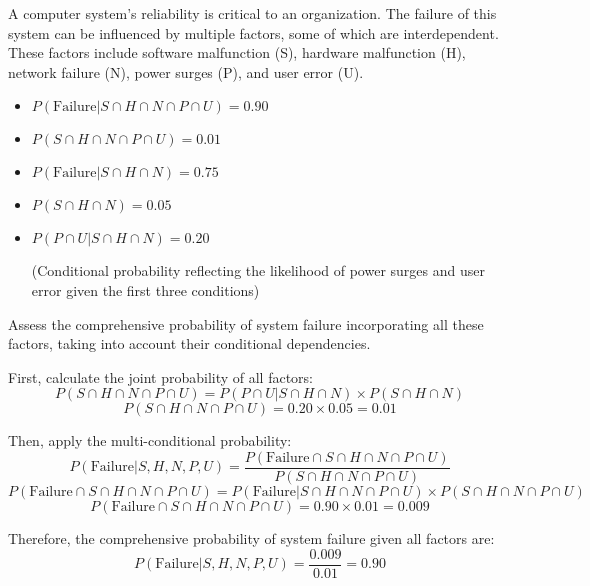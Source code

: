 \begin{example}
    A computer system's reliability is critical to an organization. The failure of this system can be influenced by multiple factors, some of which are interdependent. These factors include software malfunction (S), hardware malfunction (H), network failure (N), power surges (P), and user error (U). 
    \begin{itemize}
        \item \( P(\text{Failure} | S \cap H \cap N \cap P \cap U) = 0.90 \)
        \item \( P(S \cap H \cap N \cap P \cap U) = 0.01 \)
        \item \( P(\text{Failure} | S \cap H \cap N) = 0.75 \)
        \item \( P(S \cap H \cap N) = 0.05 \)
        \item \( P(P \cap U | S \cap H \cap N) = 0.20 \) 
        
        (Conditional probability reflecting the likelihood of power surges and user error given the first three conditions)
    \end{itemize}
    Assess the comprehensive probability of system failure incorporating all these factors, taking into account their conditional dependencies.

\begin{solution}
    First, calculate the joint probability of all factors:
    \[ P(S \cap H \cap N \cap P \cap U) = P(P \cap U | S \cap H \cap N) \times P(S \cap H \cap N) \]
    \[ P(S \cap H \cap N \cap P \cap U) = 0.20 \times 0.05 = 0.01 \]
    
    Then, apply the multi-conditional probability:
    \[ P(\text{Failure} | S, H, N, P, U) = \frac{P(\text{Failure} \cap S \cap H \cap N \cap P \cap U)}{P(S \cap H \cap N \cap P \cap U)} \]
    \[ P(\text{Failure} \cap S \cap H \cap N \cap P \cap U) = P(\text{Failure} | S \cap H \cap N \cap P \cap U) \times P(S \cap H \cap N \cap P \cap U) \]
    \[ P(\text{Failure} \cap S \cap H \cap N \cap P \cap U) = 0.90 \times 0.01 = 0.009 \]
    
    Therefore, the comprehensive probability of system failure given all factors are:
    \[ P(\text{Failure} | S, H, N, P, U) = \frac{0.009}{0.01} = 0.90 \]
\end{solution}
\end{example}

